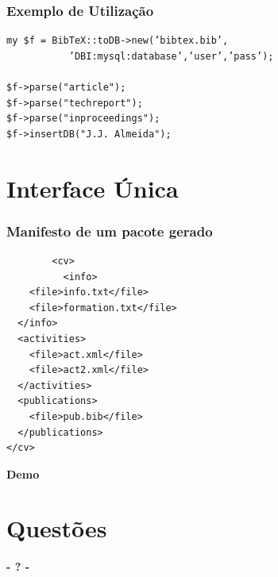 \documentclass{beamer}
\begin{document}
\begin{frame}[fragile]
	\frametitle{Exemplo de Utilização}
\begin{verbatim} 
my $f = BibTeX::toDB->new(’bibtex.bib’,
	       ’DBI:mysql:database’,’user’,’pass’);

$f->parse("article");
$f->parse("techreport");
$f->parse("inproceedings");
$f->insertDB("J.J. Almeida");
\end{verbatim}
\end{frame}

\section{Interface Única}
\begin{frame}[fragile]
	\frametitle{Manifesto de um pacote gerado}
	\begin{verbatim}
		<cv> 
		  <info>
    <file>info.txt</file>
    <file>formation.txt</file>
  </info>
  <activities>
    <file>act.xml</file>
    <file>act2.xml</file>
  </activities>
  <publications>
    <file>pub.bib</file>
  </publications>
</cv>
	\end{verbatim}
\end{frame}

\begin{frame}
	\begin{center}
		\Huge\bfseries
		Demo
	\end{center}
\end{frame}

\section{Questões}
\begin{frame}
\titlepage
	\begin{center}
		\Huge\bfseries
		- ? -
	\end{center}
\end{frame}
\end{document}
